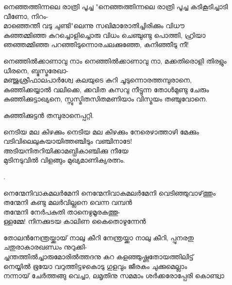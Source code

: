 \begin{enumerate}

\begin{slokam}{\VSv}{\SVL}{നെഞ്ഞത്തിന്നലെ രാത്രി പൂച്ച}
"നെഞ്ഞത്തിന്നലെ രാത്രി പൂച്ച കടികൂടിച്ചാടി വീണോ, നിറം-\\
മാഞ്ഞെന്തീ വടു ചുണ്ടി"ലെന്നു സഖിമാരോതിച്ചിരിക്കും വിധൗ\\
കുഞ്ഞമ്മിഞ്ഞ കുറച്ചൊളിച്ചൊരു വിധം ചെഞ്ചുണ്ടു പൊത്തി, ഹ്രിയാ\\
ഞഞ്ഞമ്മിഞ്ഞ പറഞ്ഞിടുന്നൊരചലക്കുഞ്ഞേ, കനിഞ്ഞീടു നീ!
\end{slokam}



\begin{slokam}{\VSr}{\Vyl}{നെഞ്ഞിൽക്കാണാവു നാം}
നെഞ്ഞിൽക്കാണാവു നാ, മക്കതിരൊളി തിരളും ധീരനെ, ബ്ഭസ്മരേഖാ-\\
മഞ്ജുശ്രീഫാലപാർശ്വേ കലയുടെ കുറി ചൂടുന്നൊരത്തമ്പുരാനെ,\\
കുഞ്ഞിക്കയ്യാൽ വലിക്കെ, ക്കവിത കസവു നീട്ടുന്ന തോള്‍മുണ്ടു ചേരും\\
കുഞ്ഞിക്കുട്ടാഖ്യനെ, സ്സുസ്മിതസിതമണിയാം വിസ്മയം തഞ്ചുവോനെ.
\end{slokam}


കുഞ്ഞിക്കുട്ടൻ തമ്പുരാനെപ്പറ്റി.


\begin{slokam}{\VMl}{\Ull}{നെടിയ മല കിഴക്കും}
നെടിയ മല കിഴക്കും നേരെഴാത്താഴി മേക്കും\\
വടിവിലെലുകയായിത്തഞ്ചിടും വഞ്ചിനാടേ!\\
അടിയനിതറിയിക്കാമബ്ധികാഞ്ചിക്കു നീയേ\\
മുടിനടുവിൽ വിളങ്ങും മുഖ്യമാണിക്യരത്നം.
\end{slokam}


.


\begin{slokam}{\VVt}{\Kund}{നെന്മേനിവാകമലർമേനി}
നെന്മേനിവാകമലർമേനി വെടിഞ്ഞുവാഴ്‌ത്തും\\
തന്മേനി കണ്ടു മലർവില്ലനെ വെന്ന വമ്പൻ\\
തന്മേനി നേർപകുതി താനെഴുമൂരകത്തു-\\
ള്ളമ്മേ! നിനക്കുടയ കാലിണ കൈതൊഴുന്നേൻ
\end{slokam}



\begin{slokam}{\VSr}{തോലൻ}{നേന്ത്രയ്ക്കായ് നാലു കീറി}
നേന്ത്രയ്ക്കാ നാലു കീറി, പ്പുനരതു ചതുരാകാരഖണ്ഡം നുറുക്കി-\\
ച്ചന്തത്തിൽച്ചാരുമോരിൽത്തദനു കറ കളഞ്ഞുഷ്ണതോയത്തിലിട്ട്\\
നെയ്യിൽ ഭൂയോ വറുത്തിട്ടഴകൊടു ഗുളവും ജീരകം ചുക്കുമെല്ലാം\\
നന്നായ് ചേർത്തങ്ങു വെച്ചാ, ലമൃതിനു സമമാം ശർക്കരോപ്പേരി കൊണ്ട്വാ
\end{slokam}


\end{enumerate}
